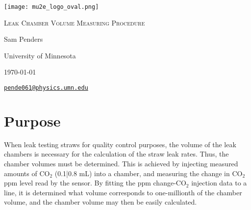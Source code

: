 \documentclass[letterpaper,12pt]{article}
\begin{document}
\begin{titlepage}
	\centering
	\texttt{[image: mu2e\_logo\_oval.png]}\par\vspace{2cm}
	{\scshape\LARGE Leak Chamber Volume Measuring Procedure\par}
	\vspace{3cm}
	{\Large Sam Penders\par}
	\vspace{3cm}
	{\large University of Minnesota\par}
 	\vspace{.5cm}
	{\large \today \par}
	\vfill
	{\par}
	\href{mailto:pende061@physics.umn.edu}{\tt{pende061@physics.umn.edu}}
\end{titlepage}

\clearpage
\setcounter{page}{2}

\section{Purpose}
When leak testing straws for quality control purposes, the volume of the leak chambers is necessary for the calculation of the straw leak rates. Thus, the chamber volumes must be determined. This is achieved by injecting measured amounts of CO$_2$ (0.1|0.8 mL) into a chamber, and measuring the change in CO$_2$ ppm level read by the sensor. By fitting the ppm change-CO$_2$ injection data to a line, it is determined what volume corresponds to one-millionth of the chamber volume, and the chamber volume may then be easily calculated.
\end{document}
